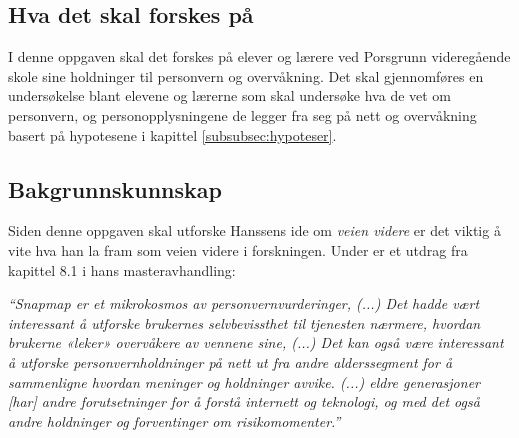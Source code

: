 \subsection{Hva det skal forskes på}
I denne oppgaven skal det forskes på elever og lærere ved Porsgrunn videregående skole sine holdninger til personvern og overvåkning. Det skal gjennomføres en undersøkelse blant elevene og lærerne som skal undersøke hva de vet om personvern, og personopplysningene de legger fra seg på nett og overvåkning basert på hypotesene i kapittel \ref{subsubsec:hypoteser}.

\subsection{Bakgrunnskunnskap}
Siden denne oppgaven skal utforske Hanssens ide om \textit{veien videre} er det viktig å vite hva han la fram som veien videre i forskningen. Under er et utdrag fra kapittel 8.1 i hans masteravhandling:

\textit{``Snapmap er et mikrokosmos av personvernvurderinger, (...) Det hadde vært interessant å utforske brukernes selvbevissthet til tjenesten nærmere, hvordan brukerne «leker» overvåkere av vennene sine, (...) Det kan også være interessant å utforske personvernholdninger på nett ut fra andre alderssegment for å sammenligne hvordan meninger og holdninger avvike. (...) eldre generasjoner [har] andre forutsetninger for å forstå internett og teknologi, og med det også andre holdninger og forventinger om risikomomenter.''} \parencite[69]{master:hanssen}

\newpage